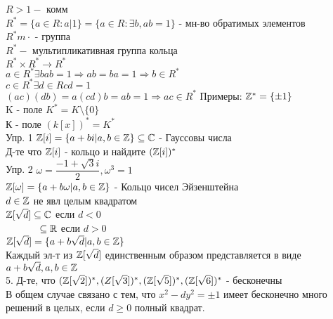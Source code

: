 $ R > 1 - $ комм \\
$ R^* = \{ a \in R : a | 1 \} = \{ a \in R : \exists b, ab=1 \} $ - мн-во обратимых элементов \\
$ R^*m \cdot $ - группа \\
$ R^* - $ мультипликативная группа кольца \\
$ R^* \times R^* \rightarrow R^* $\\
$ a \in R^* \exists b ab=1 \Rightarrow ab = ba = 1 \Rightarrow b \in R^* $\\
$ c \in R^* \exists d \in R cd = 1 $ \\
$ (ac)(db) = a (cd) b = ab = 1 \Rightarrow ac \in R^* $ 
Примеры: $ \mathbb{Z}^* = \{\pm 1\} $ \\
K - поле $ K^* = K \setminus \{0\} $\\
К - поле $ (k[x])^* = K^* $ \\
Упр. 1 $ \mathbb{Z}[i] = \{ a + bi | a,b \in \mathbb{Z} \} \subseteq \mathbb{C} $ - Гауссовы числа\\
Д-те что $ \mathbb{Z}[i] $ - кольцо и найдите $(\mathbb{Z}[i])^* $\\
Упр. 2 $ \omega = \dfrac{-1 + \sqrt{3} i}{2}, \omega^3 = 1 $ \\
$ \mathbb{Z}[\omega] = \{ a + b\omega | a,b \in \mathbb{Z} \} $ - Кольцо чисел Эйзенштейна \\
$ d \in \mathbb{Z} $ не явл целым квадратом \\
$ \mathbb{Z}[\sqrt{d}] \subseteq \mathbb{C} $ если $ d < 0 $ \\
$ \hspace*{12mm} \subseteq \R $ если $ d > 0 $ \\
$ \mathbb{Z}[\sqrt{d}] = \{ a + b\sqrt{d} | a, b \in \mathbb{Z}  \} $ \\
Каждый эл-т из $ \mathbb{Z}[\sqrt{d}] $ единственным образом представляется в виде $ a + b\sqrt{d}, a,b \in \mathbb{Z} $ \\
5. Д-те, что $ (\mathbb{Z}[\sqrt{2}])^*, (Z[\sqrt{3}])^*, (\mathbb{Z}[\sqrt{5}])^*, (\mathbb{Z}[\sqrt{6}])^* $ - бесконечны \\ 
В общем случае связано с тем, что $ x^2 - dy^2 = \pm 1$ имеет бесконечно много решений в целых, если $ d \geq 0 $ полный квадрат.


